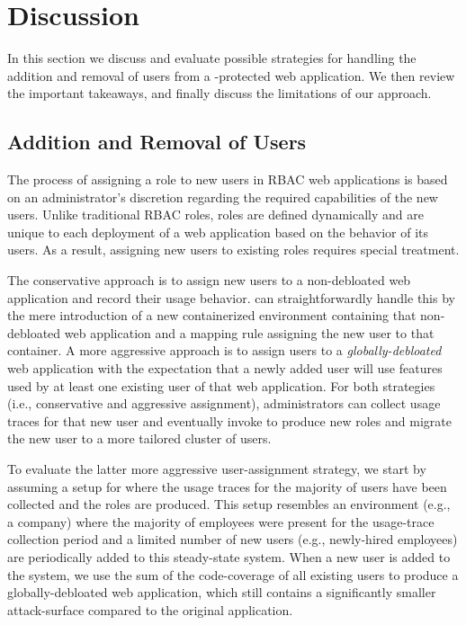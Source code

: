 \section{Discussion}

In this section we discuss and evaluate possible strategies for handling the addition and removal of users from a \dbltr{}-protected web application. We then review the important takeaways, and finally discuss the limitations of our approach.

\subsection{Addition and Removal of Users} 

The process of assigning a role to new users in RBAC web applications is based on an administrator's discretion regarding the required capabilities of the new users. 
Unlike traditional RBAC roles, \dbltr{} roles are defined dynamically and are unique to each deployment of a web application based on the behavior of its users. 
As a result, assigning new users to existing \dbltr{} roles requires special treatment. 

The conservative approach is to assign new users to a non-debloated web application and record their usage behavior. \dbltr{} can straightforwardly handle this by the mere introduction of a new containerized environment containing that non-debloated web application and a mapping rule assigning the new user to that container. A more aggressive approach is to assign users to a \emph{globally-debloated} web application with the expectation that a newly added user will use features used by at least one existing user of that web application. For both strategies (i.e., conservative and aggressive assignment), administrators can collect usage traces for that new user and eventually invoke \dbltr{} to produce new roles and migrate the new user to a more tailored cluster of users.

To evaluate the latter more aggressive user-assignment strategy, we start by assuming a setup for \dbltr{} where the usage traces for the majority of users have been collected and the roles are produced. This setup resembles an environment (e.g., a company) where the majority of employees were present for the usage-trace collection period and a limited number of new users (e.g., newly-hired employees) are periodically added to this steady-state system. When a new user is added to the system, we use the sum of the code-coverage of all existing users to produce a globally-debloated web application, which still contains a significantly smaller attack-surface compared to the original application. 


